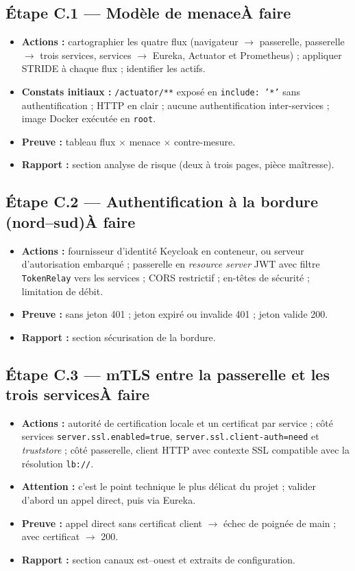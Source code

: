\documentclass[12pt,a4paper]{article}
\newcommand{\code}[1]{\texttt{\small #1}}
\newcommand{\fait}{\hfill\textcolor{green!45!black}{\small\textbf{Fait}}}
\newcommand{\afaire}{\hfill\textcolor{orange!80!black}{\small\textbf{\`A faire}}}
\newcommand{\etape}[2]{%
  \subsection*{#1\ifstrequal{#2}{f}{\fait}{\afaire}}%
}
\begin{document}
\etape{\'Etape C.1 --- Mod\`ele de menace}{a}
\begin{itemize}[leftmargin=1.4em,itemsep=0.1em]
  \item \textbf{Actions :} cartographier les quatre flux (navigateur $\rightarrow$ passerelle,
        passerelle $\rightarrow$ trois services, services $\rightarrow$ Eureka, Actuator et
        Prometheus) ; appliquer STRIDE \`a chaque flux ; identifier les actifs.
  \item \textbf{Constats initiaux :} \code{/actuator/**} expos\'e en \code{include: '*'} sans
        authentification ; HTTP en clair ; aucune authentification inter-services ; image Docker
        ex\'ecut\'ee en \code{root}.
  \item \textbf{Preuve :} tableau flux $\times$ menace $\times$ contre-mesure.
  \item \textbf{Rapport :} section analyse de risque (deux \`a trois pages, pi\`ece ma\^itresse).
\end{itemize}

\etape{\'Etape C.2 --- Authentification \`a la bordure (nord--sud)}{a}
\begin{itemize}[leftmargin=1.4em,itemsep=0.1em]
  \item \textbf{Actions :} fournisseur d'identit\'e Keycloak en conteneur, ou serveur
        d'autorisation embarqu\'e ; passerelle en \emph{resource server} JWT avec filtre
        \code{TokenRelay} vers les services ; CORS restrictif ; en-t\^etes de s\'ecurit\'e ;
        limitation de d\'ebit.
  \item \textbf{Preuve :} sans jeton 401 ; jeton expir\'e ou invalide 401 ; jeton valide 200.
  \item \textbf{Rapport :} section s\'ecurisation de la bordure.
\end{itemize}

\etape{\'Etape C.3 --- mTLS entre la passerelle et les trois services}{a}
\begin{itemize}[leftmargin=1.4em,itemsep=0.1em]
  \item \textbf{Actions :} autorit\'e de certification locale et un certificat par service ;
        c\^ot\'e services \code{server.ssl.enabled=true},
        \code{server.ssl.client-auth=need} et \emph{truststore} ; c\^ot\'e passerelle, client
        HTTP avec contexte SSL compatible avec la r\'esolution \code{lb://}.
  \item \textbf{Attention :} c'est le point technique le plus d\'elicat du projet ; valider
        d'abord un appel direct, puis via Eureka.
  \item \textbf{Preuve :} appel direct sans certificat client $\rightarrow$ \'echec de
        poign\'ee de main ; avec certificat $\rightarrow$ 200.
  \item \textbf{Rapport :} section canaux est--ouest et extraits de configuration.
\end{itemize}
\end{document}
